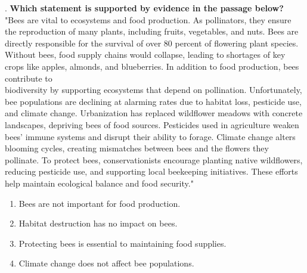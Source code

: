 \documentclass[12pt]{article}
\begin{document}
\vspace{1cm}
. \textbf{Which statement is supported by evidence in the passage below?\\}
"Bees are vital to ecosystems and food production. As pollinators, they ensure the reproduction of many plants, including fruits, vegetables, and nuts. Bees are directly responsible for the survival of over 80 percent of flowering plant species. Without bees, food supply chains would collapse, leading to shortages of key crops like apples, almonds, and blueberries. In addition to food production, bees contribute to \\biodiversity by supporting ecosystems that depend on pollination. Unfortunately, bee populations are declining at alarming rates due to habitat loss, pesticide use, and climate change. Urbanization has replaced wildflower meadows with concrete landscapes, depriving bees of food sources. Pesticides used in agriculture weaken bees' immune systems and disrupt their ability to forage. Climate change alters blooming cycles, creating mismatches between bees and the flowers they pollinate. To protect bees, conservationists encourage planting native wildflowers, reducing pesticide use, and supporting local beekeeping initiatives. These efforts help maintain ecological balance and food security."  
\begin{enumerate}[label=\Alph*.]
    \item Bees are not important for food production.  
    \item Habitat destruction has no impact on bees.  
    \item Protecting bees is essential to maintaining food supplies.  
    \item Climate change does not affect bee populations.  
\end{enumerate}
\end{document}
